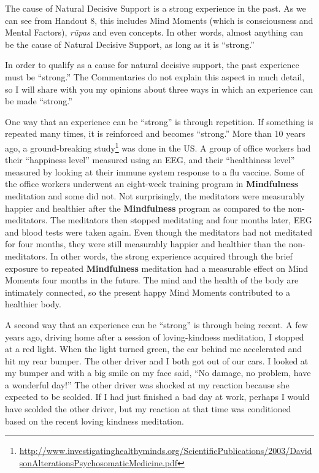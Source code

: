 The cause of Natural Decisive Support is a strong experience in the past. As we can see from Handout 8, this includes Mind Moments (which is consciousness and Mental Factors), \textit{rūpas} and even concepts. In other words, almost anything can be the cause of Natural Decisive Support, as long as it is “strong.”

In order to qualify as a cause for natural decisive support, the past experience must be “strong.” The Commentaries do not explain this aspect in much detail, so I will share with you my opinions about three ways in which an experience can be made “strong.”

One way that an experience can be “strong” is through repetition. If something is repeated many times, it is reinforced and becomes “strong.” More than 10 years ago, a ground-breaking study\footnote{\url{http://www.investigatinghealthyminds.org/ScientificPublications/2003/DavidsonAlterationsPsychosomaticMedicine.pdf}} was done in the US. A group of office workers had their “happiness level” measured using an EEG, and their “healthiness level” measured by looking at their immune system response to a flu vaccine. Some of the office workers underwent an eight-week training program in \textbf{Mindfulness} meditation and some did not. Not surprisingly, the meditators were measurably happier and healthier after the \textbf{Mindfulness} program as compared to the non-meditators. The meditators then stopped meditating and four months later, EEG and blood tests were taken again. Even though the meditators had not meditated for four months, they were still measurably happier and healthier than the non-meditators. In other words, the strong experience acquired through the brief exposure to repeated \textbf{Mindfulness} meditation had a measurable effect on Mind Moments four months in the future. The mind and the health of the body are intimately connected, so the present happy Mind Moments contributed to a healthier body.

A second way that an experience can be “strong” is through being recent. A few years ago, driving home after a session of loving-kindness meditation, I stopped at a red light. When the light turned green, the car behind me accelerated and hit my rear bumper. The other driver and I both got out of our cars. I looked at my bumper and with a big smile on my face said, “No damage, no problem, have a wonderful day!” The other driver was shocked at my reaction because she expected to be scolded. If I had just finished a bad day at work, perhaps I would have scolded the other driver, but my reaction at that time was conditioned based on the recent loving kindness meditation.

